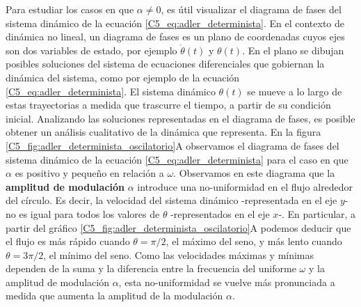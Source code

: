 \documentclass[./main.tex]{subfiles}
\begin{document}
Para estudiar los casos en que $\alpha \neq 0$, es útil visualizar el diagrama de fases del sistema dinámico de la ecuación \ref{C5_eq:adler_determinista}. En el contexto de dinámica no lineal, un diagrama de fases es un plano de coordenadas cuyos ejes son dos variables de estado, por ejemplo $\dot{\theta}(t) $ y $\theta(t)$. En el plano se dibujan posibles soluciones del sistema de ecuaciones diferenciales que gobiernan la dinámica del sistema, como por ejemplo de la ecuación \ref{C5_eq:adler_determinista}. El sistema dinámico $\theta(t)$ se mueve a lo largo de estas trayectorias a medida que trascurre el tiempo, a partir de su condición inicial. Analizando las soluciones representadas en el diagrama de fases, es posible obtener un análisis cualitativo de la dinámica que representa. En la figura \ref{C5_fig:adler_determinista_oscilatorio}A observamos el diagrama de fases del sistema dinámico de la ecuación \ref{C5_eq:adler_determinista} para el caso en que $\alpha$ es positivo y pequeño en relación a $\omega$. Observamos en este diagrama que la \textbf{amplitud de modulación} $\alpha$ introduce una no-uniformidad en el flujo alrededor del círculo. Es decir, la velocidad del sistema dinámico -representada en el eje $y$- no es igual para todos los valores de $\theta$ -representados en el eje $x$-. En particular, a partir del gráfico \ref{C5_fig:adler_determinista_oscilatorio}A podemos deducir que el flujo es más rápido cuando $\theta = \pi/2$, el máximo del seno, y más lento cuando $\theta = 3 \pi/2$, el mínimo del seno. Como las velocidades máximas y mínimas dependen de la suma y la diferencia entre la frecuencia del uniforme $\omega$ y la amplitud de modulación $\alpha$, esta no-uniformidad se vuelve más pronunciada a medida que aumenta la amplitud de la modulación $\alpha$. 
\end{document}
